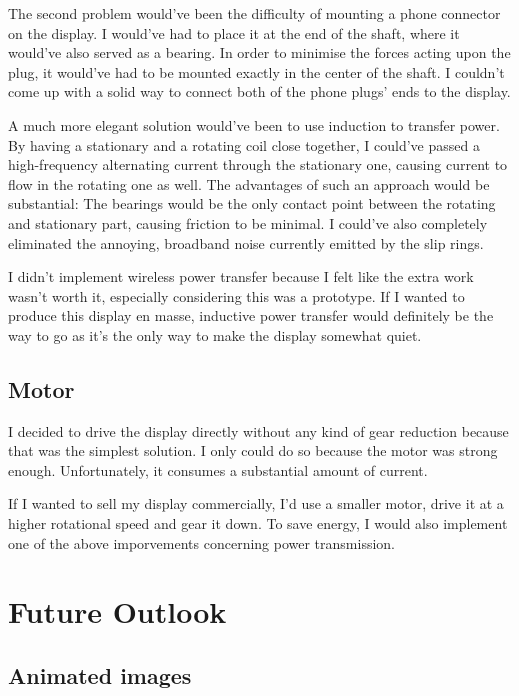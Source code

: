 \documentclass[a4paper, 11pt, titlepage]{report}
\begin{document}
The second problem would've been the difficulty of mounting a phone connector on the display. I
would've had to place it at the end of the shaft, where it would've also served as a bearing. In
order to minimise the forces acting upon the plug, it would've had to be mounted exactly in the
center of the shaft. I couldn't come up with a solid way to connect both of the phone plugs' ends
to the display.

A much more elegant solution would've been to use induction to transfer power. By having a
stationary and a rotating coil close together, I could've passed a high-frequency alternating
current through the stationary one, causing current to flow in the rotating one as well. The
advantages of such an approach would be substantial: The bearings would be the only contact point
between the rotating and stationary part, causing friction to be minimal. I could've also
completely eliminated the annoying, broadband noise currently emitted by the slip rings.

I didn't implement wireless power transfer because I felt like the extra work wasn't worth it,
especially considering this was a prototype. If I wanted to produce this display en masse,
inductive power transfer would definitely be the way to go as it's the only way to make the
display somewhat quiet.


\subsection{Motor}

I decided to drive the display directly without any kind of gear reduction because that was the
simplest solution. I only could do so because the motor was strong enough. Unfortunately, it
consumes a substantial amount of current.

If I wanted to sell my display commercially, I'd use a smaller motor, drive it at a higher
rotational speed and gear it down. To save energy, I would also implement one of the above
imporvements concerning power transmission.


\section{Future Outlook}

\subsection{Animated images}
\end{document}
